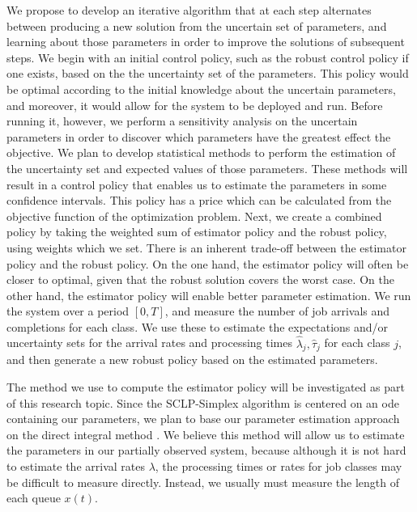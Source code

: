 \documentclass[11pt,a4paper,titlepage]{article}
\theoremstyle{definition}
\theoremstyle{plain}
\begin{document}
    We propose to develop an iterative algorithm that at each step
    alternates between producing a new solution from the uncertain set of parameters,
    and learning about those parameters in order to improve the solutions of subsequent steps.
    We begin with
    an initial control policy,
    such as the robust control policy if one exists,
    based on the the uncertainty set of the parameters.
    This policy would be optimal according to the initial knowledge about the uncertain parameters,
    and moreover,
    it would allow for the system to be deployed and run.
    Before running it,
    however,
    we perform a sensitivity analysis on the uncertain parameters in order to discover which parameters have the greatest effect the objective.
    We plan to develop statistical methods to perform the estimation of the uncertainty set and expected values of those parameters.
    These methods will result in a control policy that enables us to estimate the parameters in some confidence intervals.
    This policy has a price which can be calculated from the objective function of the optimization problem.
    Next,
    we create a combined policy by taking the weighted sum of estimator policy and the robust policy,
    using weights which we set.
    There is an inherent trade-off between the estimator policy and the robust policy.
    On the one hand,
    the estimator policy will often be closer to optimal,
    given that the robust solution covers the worst case.
    On the other hand,
    the estimator policy will enable better parameter estimation.
    We run the system over a period $[0,T]$,
    and measure the number of job arrivals and completions for each class.
    We use these to estimate the expectations and/or uncertainty sets for the arrival rates and processing times $\hat{\lambda}_j, \hat{\tau}_j$ for each class $j$,
    and then generate a new robust policy based on the estimated parameters.


    The method we use to compute the estimator policy will be investigated as part of this research topic.
    Since the SCLP-Simplex algorithm is centered on an \gls{ode} containing our parameters,
    we plan to base our parameter estimation approach on the direct integral method \autocite{dattner2015optimal,dattner2015model,yaari2018simode}.
    We believe this method will allow us to estimate the parameters in our partially observed system,
    because although it is not hard to estimate the arrival rates $\lambda$,
    the processing times or rates for job classes may be difficult to measure directly.
    Instead,
    we usually must measure the length of each queue $x(t)$.
\end{document}
